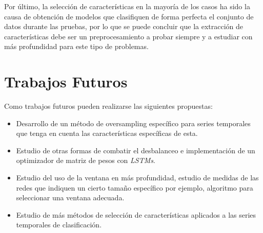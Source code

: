 Por último, la selección de características en la mayoría de los casos ha sido la causa de obtención de modelos que clasifiquen de forma perfecta el conjunto de datos durante las pruebas, por lo que se puede concluir que la extracción de características debe ser un preprocesamiento a probar siempre y a estudiar con más profundidad para este tipo de problemas.\newline

\section{Trabajos Futuros}
Como trabajos futuros pueden realizarse las siguientes propuestas:
\begin{itemize}
	\item Desarrollo de un método de oversampling específico para series temporales que tenga en cuenta las características específicas de esta.
	\item Estudio de otras formas de combatir el desbalanceo e implementación de un optimizador de matriz de pesos con \textit{LSTMs}.
	\item Estudio del uso de la ventana en más profundidad, estudio de medidas de las redes que indiquen un cierto tamaño específico por ejemplo, algoritmo para seleccionar una ventana adecuada.
	\item Estudio de más métodos de selección de características aplicados a las series temporales de clasificación.
\end{itemize}